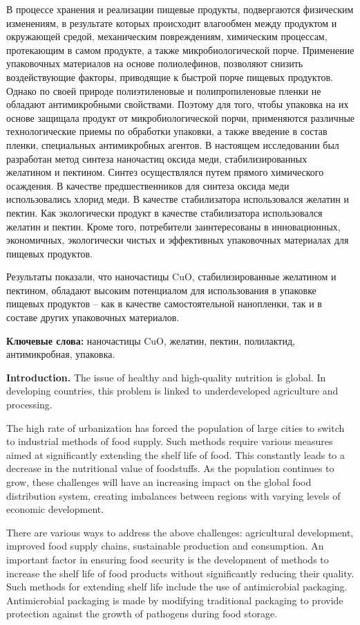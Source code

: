В процессе хранения и реализации пищевые продукты, подвергаются
физическим изменениям, в результате которых происходит влагообмен между
продуктом и окружающей средой, механическим повреждениям, химическим
процессам, протекающим в самом продукте, а также микробиологической
порче. Применение упаковочных материалов на основе полиолефинов,
позволяют снизить воздействующие факторы, приводящие к быстрой порче
пищевых продуктов. Однако по своей природе полиэтиленовые и
полипропиленовые пленки не обладают антимикробными свойствами. Поэтому
для того, чтобы упаковка на их основе защищала продукт от
микробиологической порчи, применяются различные технологические приемы
по обработки упаковки, а также введение в состав пленки, специальных
антимикробных агентов. В настоящем исследовании был разработан метод
синтеза наночастиц оксида меди, стабилизированных желатином и пектином.
Синтез осуществлялся путем прямого химического осаждения. В качестве
предшественников для синтеза оксида меди использовались хлорид меди. В
качестве стабилизатора использовался желатин и пектин. Как экологически
продукт в качестве стабилизатора использовался желатин и пектин. Кроме
того, потребители заинтересованы в инновационных, экономичных,
экологически чистых и эффективных упаковочных материалах для пищевых
продуктов.

Результаты показали, что наночастицы CuO, стабилизированные желатином и
пектином, обладают высоким потенциалом для использования в упаковке
пищевых продуктов -- как в качестве самостоятельной нанопленки, так и в
составе других упаковочных материалов.

{\bfseries Ключевые слова:} наночастицы CuO, желатин, пектин, полилактид,
антимикробная, упаковка.

{\bfseries Introduction.} The issue of healthy and high-quality nutrition
is global. In developing countries, this problem is linked to
underdeveloped agriculture and processing.

The high rate of urbanization has forced the population of large cities
to switch to industrial methods of food supply. Such methods require
various measures aimed at significantly extending the shelf life of
food. This constantly leads to a decrease in the nutritional value of
foodstuffs. As the population continues to grow, these challenges will
have an increasing impact on the global food distribution system,
creating imbalances between regions with varying levels of economic
development.

There are various ways to address the above challenges: agricultural
development, improved food supply chains, sustainable production and
consumption. An important factor in ensuring food security is the
development of methods to increase the shelf life of food products
without significantly reducing their quality. Such methods for extending
shelf life include the use of antimicrobial packaging. Antimicrobial
packaging is made by modifying traditional packaging to provide
protection against the growth of pathogens during food storage.


